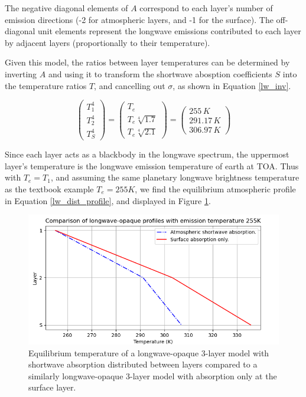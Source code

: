 \documentclass[12pt]{article}
\begin{document}
The negative diagonal elements of $A$ correspond to each layer's number of emission directions (-2 for atmospheric layers, and -1 for the surface).
The off-diagonal unit elements represent the longwave emissions contributed to each layer by adjacent layers (proportionally to their temperature).

Given this model, the ratios between layer temperatures can be determined by inverting $A$ and using it to transform the shortwave abosption coefficients $S$
into the temperature ratios $T$, and cancelling out $\sigma$, as shown in Equation \ref{lw_inv}.

\begin{equation}\label{lw_dist_profile}
        \begin{pmatrix} T_1^4 \\ T_2^4 \\ T_S^4 \end{pmatrix}
            = \begin{pmatrix} T_e \\ T_e \sqrt[4]{1.7} \\ T_e \sqrt[4]{2.1} \end{pmatrix}
            = \begin{pmatrix} 255\,\si{K} \\ 291.17\,\si{K} \\ 306.97\,\si{K} \end{pmatrix}
\end{equation}

Since each layer acts as a blackbody in the longwave spectrum, the uppermost layer's temperature is the longwave emission temperature of earth at TOA.
Thus with $T_e = T_1$, and assuming the same planetary longwave brightness temperature as the textbook example $T_e = 255\si{K}$,
we find the equilibrium atmospheric profile in Equation \ref{lw_dist_profile}, and displayed in Figure \ref{3ly_compare}.

\begin{figure}[h!]
    \centering
    \includegraphics[width=.9\textwidth]{3-layer-temperature-comparison.png}
    \caption{Equilibrium temperature of a longwave-opaque 3-layer model with shortwave absorption distributed between layers compared to a similarly longwave-opaque 3-layer model with absorption only at the surface layer. }
    \label{3ly_compare}
\end{figure}
\end{document}
